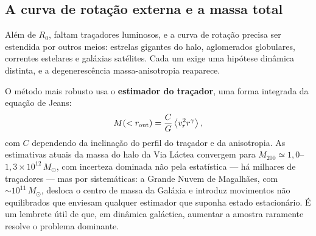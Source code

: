 \documentclass[11pt,a4paper]{article}
\begin{document}
\subsection*{A curva de rotação externa e a massa total}

Além de $R_0$, faltam traçadores luminosos, e a curva de rotação precisa ser estendida por outros meios: estrelas gigantes do halo, aglomerados globulares, correntes estelares e galáxias satélites. Cada um exige uma hipótese dinâmica distinta, e a degenerescência massa-anisotropia reaparece.

O método mais robusto usa o \textbf{estimador do traçador}, uma forma integrada da equação de Jeans:
\[
M(<r_{\rm out})=\frac{C}{G}\left\langle v_r^{2}r^{\gamma}\right\rangle,
\]
com $C$ dependendo da inclinação do perfil do traçador e da anisotropia. As estimativas atuais da massa do halo da Via Láctea convergem para $M_{200}\simeq1{,}0$--$1{,}3\times10^{12}\,M_\odot$, com incerteza dominada não pela estatística --- há milhares de traçadores --- mas por sistemáticas: a Grande Nuvem de Magalhães, com $\sim10^{11}\,M_\odot$, desloca o centro de massa da Galáxia e introduz movimentos não equilibrados que enviesam qualquer estimador que suponha estado estacionário. É um lembrete útil de que, em dinâmica galáctica, aumentar a amostra raramente resolve o problema dominante.
\end{document}
